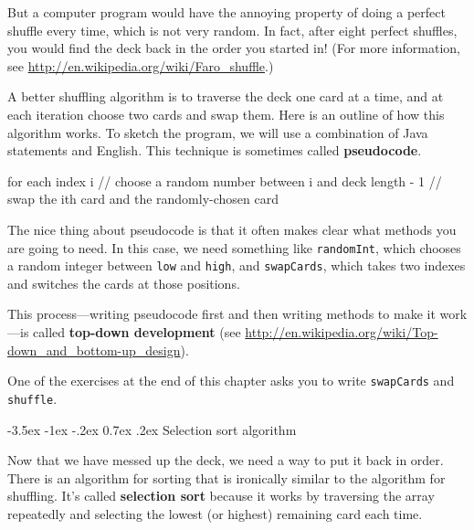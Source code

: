 \documentclass[12pt]{book}
\makeatletter
\theoremstyle{exercise}
\newcommand{\java}[1]{\verb"#1"}
\renewcommand{\section}{\@startsection{section}{1}{\z@}%
    {-3.5ex \@plus -1ex \@minus -.2ex}%
    {0.7ex \@plus.2ex}%
    {\normalfont\Large\bfseries}}
\newcommand{\java}[1]{\lstinline{#1}} %
\makeatother
\begin{document}
But a computer program would have the annoying property of doing a perfect shuffle every time, which is not very random.
In fact, after eight perfect shuffles, you would find the deck back in the order you started in!
(For more information, see \url{http://en.wikipedia.org/wiki/Faro_shuffle}.)


A better shuffling algorithm is to traverse the deck one card at a time, and at each iteration choose two cards and swap them.
Here is an outline of how this algorithm works.
To sketch the program, we will use a combination of Java statements and English.
This technique is sometimes called {\bf pseudocode}.

\begin{code}
    for each index i {
        // choose a random number between i and deck length - 1
        // swap the ith card and the randomly-chosen card
    }
\end{code}


The nice thing about pseudocode is that it often makes clear what methods you are going to need.
In this case, we need something like \java{randomInt}, which chooses a random integer between \java{low} and \java{high}, and \java{swapCards}, which takes two indexes and switches the cards at those positions.


This process---writing pseudocode first and then writing methods to make it work---is called {\bf top-down development} (see \url{http://en.wikipedia.org/wiki/Top-down_and_bottom-up_design}).


One of the exercises at the end of this chapter asks you to write \java{swapCards} and \java{shuffle}.


\section{Selection sort algorithm}
\label{sorting}


Now that we have messed up the deck, we need a way to put it back in order.
There is an algorithm for sorting that is ironically similar to the algorithm for shuffling.
It's called {\bf selection sort} because it works by traversing the array repeatedly and selecting the lowest (or highest) remaining card each time.
\end{document}
